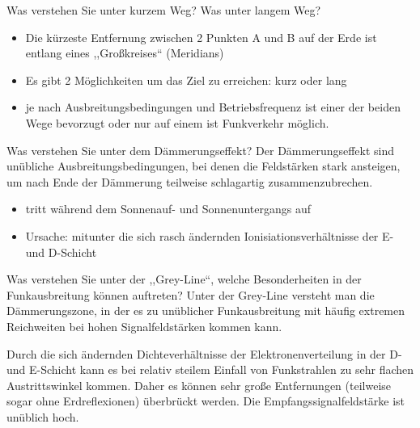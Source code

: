 \documentclass[avery5371,grid,frame,a4paper]{flashcards}
\newcommand{\card}[3]{
  \begin{flashcard}[{\chap} -- #1]{#2}#3\end{flashcard}
}
\begin{document}
\card{18}{Was verstehen Sie unter kurzem Weg? Was unter langem Weg?}{
  \begin{itemize}
    \item Die kürzeste Entfernung zwischen 2 Punkten A und B auf der Erde ist entlang eines ,,Großkreises`` (Meridians)
    \item Es gibt 2 Möglichkeiten um das Ziel zu erreichen:  kurz oder lang
    \item je nach Ausbreitungsbedingungen und Betriebsfrequenz ist einer der beiden Wege bevorzugt oder nur auf einem ist Funkverkehr möglich.
  \end{itemize}
}
\card{19}{Was verstehen Sie unter dem Dämmerungseffekt?}{
  Der Dämmerungseffekt sind unübliche Ausbreitungsbedingungen, bei denen die Feldstärken stark ansteigen, um nach Ende der Dämmerung teilweise schlagartig zusammenzubrechen.
  \begin{itemize}
    \item tritt während dem Sonnenauf- und Sonnenuntergangs auf
    \item Ursache: mitunter die sich rasch ändernden Ionisiationsverhältnisse der E- und D-Schicht
  \end{itemize}
}
\card{20}{Was verstehen Sie unter der ,,Grey-Line``, welche Besonderheiten in der Funkausbreitung können auftreten?}{
  Unter der Grey-Line versteht man die Dämmerungszone, in der es zu unüblicher Funkausbreitung mit häufig extremen Reichweiten bei hohen Signalfeldstärken kommen kann.

  Durch die sich ändernden Dichteverhältnisse der Elektronenverteilung in der D- und E-Schicht kann es bei relativ steilem Einfall von Funkstrahlen zu sehr flachen Austrittswinkel kommen. Daher es können sehr große Entfernungen (teilweise sogar ohne Erdreflexionen) überbrückt werden. Die Empfangssignalfeldstärke ist unüblich hoch.
}
\end{document}
